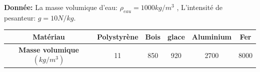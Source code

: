\documentclass[12pt]{article}
\begin{document}
\textbf{Donnée: } La masse volumique d'eau: $\rho_{eau} = 1000 kg/m^3$ , L'intensité de pesanteur: $g = 10N/kg$.

\begin{center}
\begin{tabular}{ |c| c| c| c|c|c| }
	\hline
	\textbf{Matériau}                   & Polystyrène & Bois &glace &Aluminium&Fer\\\hline 
	\textbf{Masse volumique} $(kg/m^3)$ & 11 & 850 &920 &2700& 8000\\\hline
\end{tabular}
\end{center}
\end{document}

